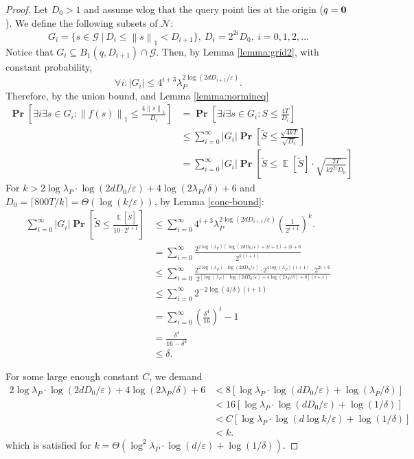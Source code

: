 \documentclass[10pt,a4paper,twoside]{book}
\newcommand{\mbf}[1]{\mbox{\boldmath$\rm{#1}$}}
\newcommand{\eps}{\varepsilon}
\newcommand{\net}{\mathcal{N}}
\newcommand{\grid}{\mathcal{G}}
\newcommand{\norm}[1]{\left \rVert {#1} \right \rVert}
\DeclareMathOperator*{\prob}{\mathbf{Pr}}
\DeclareMathOperator*{\EE}{\mathbb{E}}
\theoremstyle{definition}
\theoremstyle{remark}
\begin{document}
\begin{proof}
Let $D_0>1$ and assume wlog that the query point lies at the origin ($q = \mbf{0}$). We define the following subsets of $\net$:
\begin{equation*}
    G_i = \{ s \in \grid \ | \ D_i \leq \norm{s}_1 < D_{i+1} \}, \ D_i = 2^{2i} D_0, \ i = 0, 1, 2, \ldots
\end{equation*}
Notice that $G_i \subseteq B_1(q, D_{i+1}) \cap \grid$. Then, by Lemma \ref{lemma:grid2}, with constant probability,
\[\forall i: |G_i| \leq 4^{i+3} \lambda_P^{2\log (2d D_{i+1}/\eps)}. \]
Therefore, by the union bound, and Lemma \ref{lemma:normineq}
\begin{align*}
    \prob \left[ \exists i \exists s \in G_i : \norm{f(s)}_{1} \leq \frac{4\norm{s}_{1}}{D_i}  \right] &= \prob \left[ \exists i \exists s \in G_i : S \leq \frac{4T}{D_i}  \right]\\
    &\leq \sum_{i=0}^{\infty} |G_i| \prob \left[\tilde{S} \leq \frac{\sqrt{4kT}}{\sqrt{D_i}} \right] \\
    &= \sum_{i=0}^{\infty} |G_i| \prob \left[\tilde{S} \leq \EE[\tilde{S}] \cdot \sqrt{\frac{2T}{k 2^{2i} D_0}} \right]
\end{align*}
For $k > 2\log{\lambda_P} \cdot \log(2d D_0/ \eps)+4 \log (2 \lambda_P/\delta) +6$ and $D_0 =\lceil 800T/k \rceil = \Theta(\log (k/\eps))$, by Lemma \ref{conc-bound}:
\begin{align*}
    \sum_{i=0}^{\infty} |G_i| \prob \left[\tilde{S} \leq \frac{\EE[\tilde{S}]}{10 \cdot 2^{i+1}} \right] &\leq \sum_{i=0}^{\infty} 4^{i+3} \lambda_P ^ {2\log (2d D_{i+1}/\eps )} \left( \frac{1}{2^{i+1}} \right)^k. \\
    &= \sum_{i=0}^{\infty} \frac{ 2^{2\log(\lambda_P)({\log{(2d D_0/ \eps)}+2i+2}) + 2i + 6}}{ 2^{k(i+1)}} \\
    &\leq \sum_{i=0}^{\infty} \frac{ 2^{2\log(\lambda_P) \cdot \log{(2d D_0/ \eps)}} \cdot 2^{4\log(\lambda_P) (i+1)} \cdot 2^{2i+6}}{ 2^{[\log(\lambda_P) \cdot \log{(2d D_0/ \eps)} + 4 \log (2 \lambda_P/\delta) + 6](i+1)}} \\
    &\leq \sum_{i=0}^{\infty} { 2^{-2 \log (4/\delta)(i+1)} } \\
    &= \sum_{i=0}^{\infty} \left( \frac{\delta^4}{16} \right)^{i} - 1 \\
    &= \frac{\delta^4}{16 - \delta^4} \\
    &\leq \delta.
\end{align*}

For some large enough constant $C$, we demand
\begin{align*}
    2\log{\lambda_P} \cdot \log(2d D_0/ \eps)+4 \log (2 \lambda_P/\delta) + 6 
    &< 8[ \log{\lambda_P} \cdot \log(d D_0/ \eps)+ \log ( \lambda_P/\delta) ] \\
    &< 16[ \log{\lambda_P} \cdot \log(d D_0/ \eps)+ \log ( 1/\delta) ] \\
    &< C[ \log{\lambda_P} \cdot \log(d \log k/ \eps)+ \log ( 1/\delta) ] \\
    &< k.
\end{align*}
which is satisfied for $k = \Theta \left( \log^{2}{\lambda_P} \cdot \log ( d/ \eps) + \log (1/ \delta) \right)$.
\end{proof}
\end{document}
